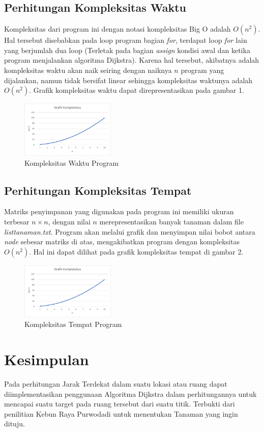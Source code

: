 \documentclass[conference]{IEEEtran}
\begin{document}
\subsection{Perhitungan Kompleksitas Waktu}
Kompleksitas dari program ini dengan notasi kompleksitas Big O adalah $O(n^2)$. Hal tersebut disebabkan pada loop program
bagian \textit{for}, terdapat loop \textit{for} lain yang berjumlah dua loop (Terletak pada bagian \textit{assign} kondisi awal
dan ketika program menjalankan algoritma Dijkstra). Karena hal tersebut, akibatnya adalah kompleksitas waktu akan naik seiring dengan
naiknya $n$ program yang dijalankan, namun tidak bersifat linear sehingga kompleksitas waktunya adalah $O(n^2)$. Grafik kompleksitas waktu dapat
direpresentasikan pada gambar 1. 
\begin{figure}[htbp]
    \includegraphics[width=0.4\textwidth]{kompleksitas}
    \centering
    \caption{Kompleksitas Waktu Program}
    \label{fig:mesh1}
\end{figure}

\subsection{Perhitungan Kompleksitas Tempat}
Matriks penyimpanan yang digunakan pada program ini memiliki ukuran terbesar $n \times n$, dengan nilai
$n$ merepresentasikan banyak tanaman dalam file \textit{listtanaman.txt}. Program akan melalui grafik dan menyimpan
nilai bobot antara \textit{node} sebesar matriks di atas, mengakibatkan program dengan kompleksitas $O(n^2)$. Hal ini dapat
dilihat pada grafik kompleksitas tempat di gambar 2.
\begin{figure}[htbp]
    \includegraphics[width=0.4\textwidth]{kompleksitas}
    \centering
    \caption{Kompleksitas Tempat Program}
    \label{fig:mesh2}
\end{figure}


\section{Kesimpulan}
Pada perhitungan Jarak Terdekat dalam suatu lokasi atau ruang dapat diimplementasikan penggunaan Algoritma Dijkstra
dalam perhitungannya untuk mencapai suatu target pada ruang tersebut dari suatu titik. Terbukti dari penilitian
Kebun Raya Purwodadi untuk menentukan Tanaman yang ingin dituju.




\end{document}
